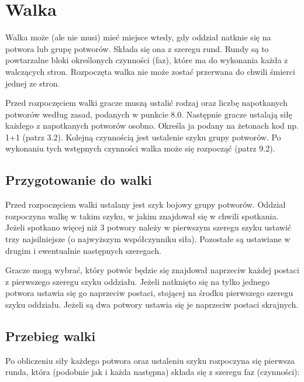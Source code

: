 \section{Walka}

Walka może (ale nie musi) mieć miejsce wtedy, gdy oddział natknie się na potwora lub grupę potworów.
Składa się ona z szeregu rund.
Rundy są to powtarzalne bloki określonych czynności (faz), które ma do wykonania każda z walczących stron.
Rozpoczęta walka nie może zostać przerwana do chwili śmierci jednej ze stron.

Przed rozpoczęciem walki gracze muszą ustalić rodzaj oraz liczbę napotkanych potworów według zasad, podanych w punkcie 8.0.
Następnie gracze ustalają siłę każdego z napotkanych potworów osobno.
Określa ja podany na żetonach kod np. 1+1 (patrz 3.2).
Kolejną czynnością jest ustalenie szyku grupy potworów.
Po wykonaniu tych wstępnych czynności walka może się rozpocząć (patrz 9.2).

\subsection{Przygotowanie do walki}

Przed rozpoczęciem walki ustalany jest szyk bojowy grupy potworów.
Oddział rozpoczyna walkę w takim szyku, w jakim znajdował się w chwili spotkania.
Jeżeli spotkano więcej niż 3 potwory należy w pierwszym szeregu szyku ustawić trzy najsilniejsze (o najwyższym współczynniku siła).
Pozostałe są ustawiane w drugim i ewentualnie następnych szeregach.

Gracze mogą wybrać, który potwór będzie się znajdował naprzeciw każdej postaci z pierwszego szeregu szyku oddziału.
Jeżeli natknięto się na tylko jednego potwora ustawia się go naprzeciw postaci, stojącej na środku pierwszego szeregu szyku oddziału.
Jeżeli są dwa potwory ustawia się je naprzeciw postaci skrajnych.

\subsection{Przebieg walki}

Po obliczeniu siły każdego potwora oraz ustaleniu szyku rozpoczyna się pierwsza runda, która (podobnie jak i każda następna) składa się z szeregu faz (czynności):

